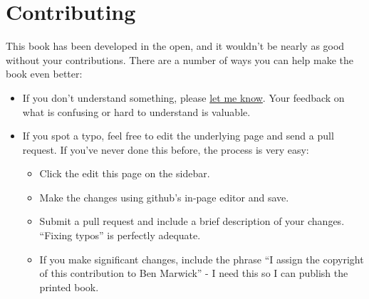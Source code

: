 \chapter{Contributing}

This book has been developed in the open, and it wouldn't be nearly as
good without your contributions. There are a number of ways you can help
make the book even better:

\begin{itemize}
\item
  If you don't understand something, please
  \href{mailto:benmarwick@gmail.com}{let me know}. Your feedback on what
  is confusing or hard to understand is valuable.
\item
  If you spot a typo, feel free to edit the underlying page and send a
  pull request. If you've never done this before, the process is very
  easy:

  \begin{itemize}
  \item
    Click the edit this page on the sidebar.
  \item
    Make the changes using github's in-page editor and save.
  \item
    Submit a pull request and include a brief description of your
    changes. ``Fixing typos'' is perfectly adequate.
  \item
    If you make significant changes, include the phrase ``I assign the
    copyright of this contribution to Ben Marwick'' - I need this so I
    can publish the printed book.
  \end{itemize}
\end{itemize}
